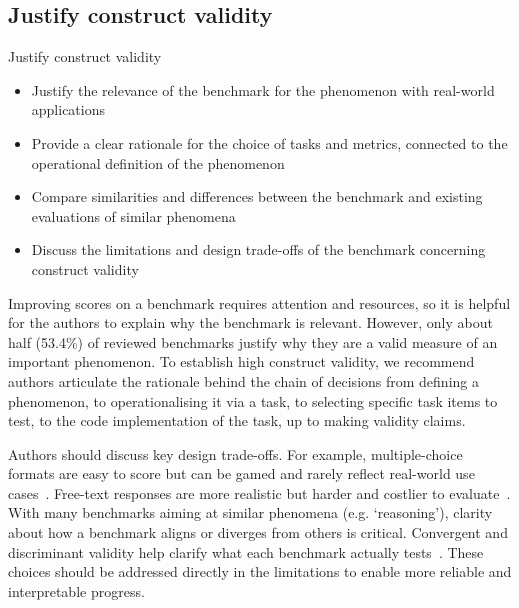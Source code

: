 \subsection{Justify construct validity}
\vspace{-5pt}
\begin{checklistbox}{Justify construct validity}
    \begin{itemize}[leftmargin=5pt, label=\scriptsize$\square$]
    \item Justify the relevance of the benchmark for the phenomenon with real-world applications
    \item Provide a clear rationale for the choice of tasks and metrics, connected to the operational definition of the phenomenon
    \item Compare similarities and differences between the benchmark and existing evaluations of similar phenomena
    \item Discuss the limitations and design trade-offs of the benchmark concerning construct validity
\end{itemize}
\end{checklistbox}

Improving scores on a benchmark requires attention and resources, so it is helpful for the authors to explain why the benchmark is relevant. However, only about half (53.4\%) of reviewed benchmarks justify why they are a valid measure of an important phenomenon. To establish high construct validity, we recommend authors articulate the rationale behind the chain of decisions from defining a phenomenon, to operationalising it via a task, to selecting specific task items to test, to the code implementation of the task, up to making validity claims. 

Authors should discuss key design trade-offs. For example, multiple-choice formats are easy to score but can be gamed and rarely reflect real-world use cases~\cite{mccoyRightWrongReasons2019b}. Free-text responses are more realistic but harder and costlier to evaluate~\cite{bidermanLessonsTrenchesReproducible2024a}. With many benchmarks aiming at similar phenomena (e.g. `reasoning'), clarity about how a benchmark aligns or diverges from others is critical. Convergent and discriminant validity help clarify what each benchmark actually tests~\cite{alaaMedicalLargeLanguage2025a}. These choices should be addressed directly in the limitations to enable more reliable and interpretable progress.
